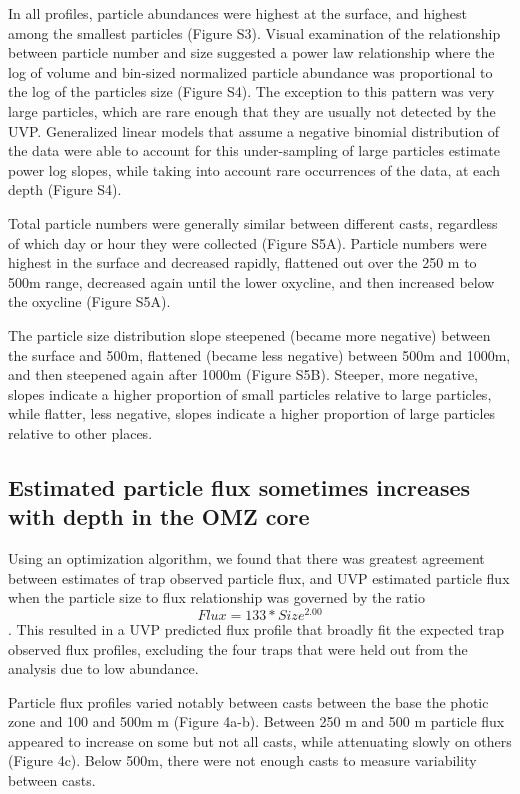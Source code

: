 \documentclass[]{article}
\begin{document}
In all profiles, particle abundances were highest at the surface, and
highest among the smallest particles (Figure S3). Visual examination of
the relationship between particle number and size suggested a power law
relationship where the log of volume and bin-sized normalized particle
abundance was proportional to the log of the particles size (Figure S4).
The exception to this pattern was very large particles, which are rare
enough that they are usually not detected by the UVP. Generalized linear
models that assume a negative binomial distribution of the data were
able to account for this under-sampling of large particles estimate
power log slopes, while taking into account rare occurrences of the
data, at each depth (Figure S4).

Total particle numbers were generally similar between different casts,
regardless of which day or hour they were collected (Figure S5A).
Particle numbers were highest in the surface and decreased rapidly,
flattened out over the 250 m to 500m range, decreased again until the
lower oxycline, and then increased below the oxycline (Figure S5A).

The particle size distribution slope steepened (became more negative)
between the surface and 500m, flattened (became less negative) between
500m and 1000m, and then steepened again after 1000m (Figure S5B).
Steeper, more negative, slopes indicate a higher proportion of small
particles relative to large particles, while flatter, less negative,
slopes indicate a higher proportion of large particles relative to other
places.

\hypertarget{estimated-particle-flux-sometimes-increases-with-depth-in-the-omz-core}{%
\subsection{Estimated particle flux sometimes increases with depth in
the OMZ
core}\label{estimated-particle-flux-sometimes-increases-with-depth-in-the-omz-core}}

Using an optimization algorithm, we found that there was greatest
agreement between estimates of trap observed particle flux, and UVP
estimated particle flux when the particle size to flux relationship was
governed by the ratio \[Flux = 133 * Size ^ {2.00}\]. This resulted in a
UVP predicted flux profile that broadly fit the expected trap observed
flux profiles, excluding the four traps that were held out from the
analysis due to low abundance.

Particle flux profiles varied notably between casts between the base the
photic zone and 100 and 500m m (Figure 4a-b). Between 250 m and 500 m
particle flux appeared to increase on some but not all casts, while
attenuating slowly on others (Figure 4c). Below 500m, there were not
enough casts to measure variability between casts.
\end{document}
